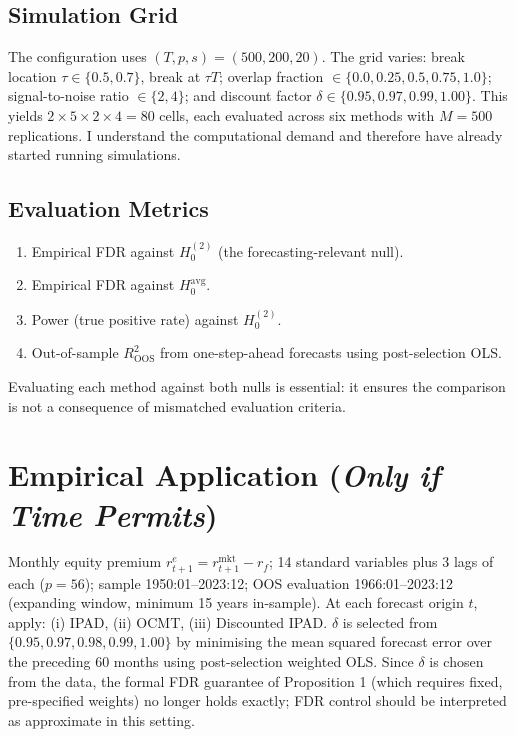 \documentclass[12pt, a4paper]{article}
\begin{document}
\subsection{Simulation Grid}
The configuration uses $(T, p, s) = (500, 200, 20)$. The grid varies: break location $\tau \in \{0.5, 0.7\}$, break at $\tau T$; overlap fraction $\in \{0.0, 0.25, 0.5, 0.75, 1.0\}$; signal-to-noise ratio $\in \{2, 4\}$; and discount factor $\delta \in \{0.95, 0.97, 0.99, 1.00\}$. This yields $2 \times 5 \times 2 \times 4 = 80$ cells, each evaluated across six methods with $M = 500$ replications. I understand the computational demand and therefore have already started running simulations.

\subsection{Evaluation Metrics}

\begin{enumerate}[label=(\arabic*), itemsep=4pt]
    \item Empirical FDR against $H_0^{(2)}$ (the forecasting-relevant null).
    \item Empirical FDR against $H_0^{\text{avg}}$.
    \item Power (true positive rate) against $H_0^{(2)}$.
    \item Out-of-sample $R^2_{\text{OOS}}$ from one-step-ahead forecasts using post-selection OLS.
\end{enumerate}
Evaluating each method against both nulls is essential: it ensures the comparison is not a consequence of mismatched evaluation criteria. 

\section{Empirical Application (\textit{Only if Time Permits})}

Monthly equity premium $r_{t+1}^e = r_{t+1}^{\text{mkt}} - r_f$; 14 standard \citet{welch2008} variables plus 3 lags of each ($p = 56$); sample 1950:01--2023:12; OOS evaluation 1966:01--2023:12 (expanding window, minimum 15 years in-sample). At each forecast origin $t$, apply: (i) IPAD, (ii) OCMT, (iii) Discounted IPAD. $\delta$ is selected from $\{0.95, 0.97, 0.98, 0.99, 1.00\}$ by minimising the mean squared forecast error over the preceding 60 months using post-selection weighted OLS. Since $\delta$ is chosen from the data, the formal FDR guarantee of Proposition 1 (which requires fixed, pre-specified weights) no longer holds exactly; FDR control should be interpreted as approximate in this setting.
\end{document}
